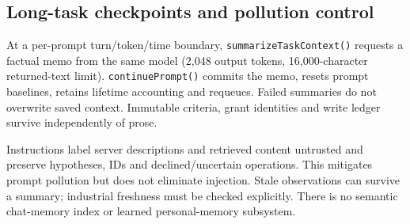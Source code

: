 \subsection{Long-task checkpoints and pollution control}
At a per-prompt turn/token/time boundary, \texttt{summarizeTaskContext()} requests a factual memo from the same model (2,048 output tokens, 16,000-character returned-text limit). \texttt{continuePrompt()} commits the memo, resets prompt baselines, retains lifetime accounting and requeues. Failed summaries do not overwrite saved context. Immutable criteria, grant identities and write ledger survive independently of prose.

Instructions label server descriptions and retrieved content untrusted and preserve hypotheses, IDs and declined/uncertain operations. This mitigates prompt pollution but does not eliminate injection. Stale observations can survive a summary; industrial freshness must be checked explicitly. There is no semantic chat-memory index or learned personal-memory subsystem.
